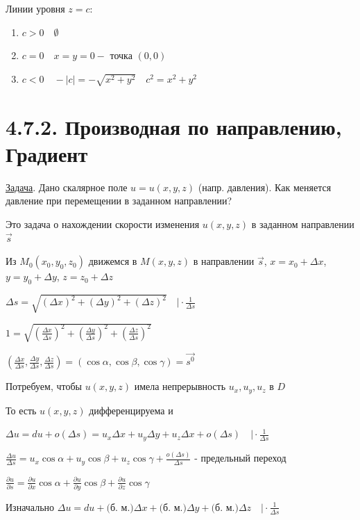 \documentclass[12pt]{article}
\begin{document}
    Линии уровня $z = c$:

    \begin{enumerate}
        \item $c > 0 \quad \emptyset$
        \item $c = 0 \quad x = y = 0 - $ точка $(0, 0)$
        \item $c < 0 \quad -|c| = -\sqrt{x^2 + y^2} \quad c^2 = x^2 + y^2$
    \end{enumerate}


    \section{4.7.2. Производная по направлению, Градиент}

    \underline{Задача}. Дано скалярное поле $u = u(x, y, z)$ (напр. давления). Как меняется давление при перемещении в заданном направлении?

    Это задача о нахождении скорости изменения $u(x, y, z)$ в заданном направлении $\overrightarrow{s}$

    Из $M_0(x_0, y_0, z_0)$ движемся в $M(x, y, z)$ в направлении $\overrightarrow{s}$, $x = x_0 + \Delta x$, $y = y_0 + \Delta y$, $z = z_0 + \Delta z$

    $\Delta s = \sqrt{(\Delta x)^2 + (\Delta y)^2 + (\Delta z)^2} \quad \Big| \cdot \frac{1}{\Delta s}$

    $1 = \sqrt{\left(\frac{\Delta x}{\Delta s}\right)^2 + \left(\frac{\Delta y}{\Delta s}\right)^2 + \left(\frac{\Delta z}{\Delta s}\right)^2}$

    $(\frac{\Delta x}{\Delta s}, \frac{\Delta y}{\Delta s}, \frac{\Delta z}{\Delta s}) = (\cos\alpha, \cos\beta, \cos\gamma) = \overrightarrow{s^0}$

    Потребуем, чтобы $u(x, y, z)$ имела непрерывность $u_x, u_y, u_z$ в $D$

    То есть $u(x, y, z)$ дифференцируема и

    $\Delta u = du + o(\Delta s) = u_x \Delta x + u_y \Delta y + u_z \Delta x + o(\Delta s) \quad \Big| \cdot \frac{1}{\Delta s}$

    $\frac{\Delta u}{\Delta s} = u_x \cos\alpha + u_y \cos\beta + u_z \cos\gamma + \frac{o(\Delta s)}{\Delta s}$ - предельный переход

    $\frac{\partial u}{\partial s} = \frac{\partial u}{\partial x} \cos\alpha + \frac{\partial u}{\partial y} \cos\beta + \frac{\partial u}{\partial z} \cos\gamma$

    \Nota Изначально $\Delta u = du + \text{(б. м.)} \Delta x + \text{(б. м.)} \Delta y + \text{(б. м.)} \Delta z \quad \Big| \cdot \frac{1}{\Delta s}$
\end{document}
